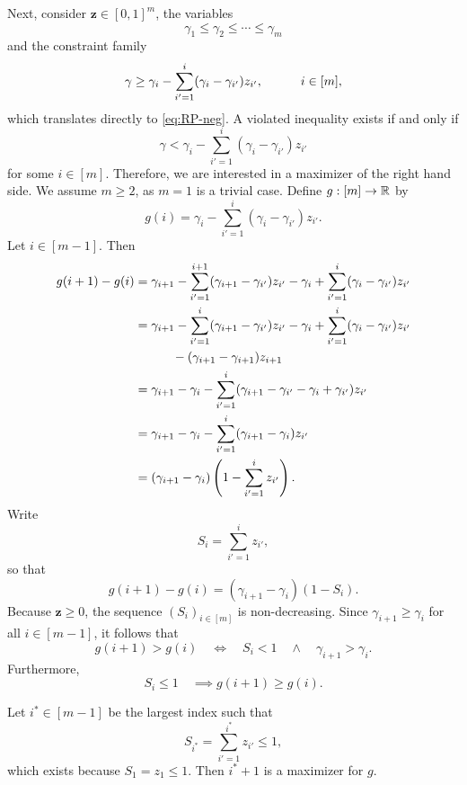 Next, consider $\bm{z} \in [0,1]^m$, the variables
\[
    \gamma_1 \leq \gamma_2 \leq \cdots \leq \gamma_m
\]
and the constraint family
\begin{equation}\label{eq:RP-neg-onedim}
    \gamma \geq \gamma_i - \sum_{i' = 1}^{i} (\gamma_i - \gamma_{i'}) z_{i'}, \quad \quad \quad i \in [m],
\end{equation}
which translates directly to \eqref{eq:RP-neg}.
A violated inequality exists if and only if
\[
    \gamma < \gamma_i -  \sum_{i' = 1}^{i} (\gamma_i - \gamma_{i'}) z_{i'}
\]
for some $i \in [m].$
Therefore, we are interested in a maximizer of the right hand side.
We assume $m \geq 2$, as $m=1$ is a trivial case.
Define $g: [m] \to \mathbb{R}$ by
\[
    g(i) = \gamma_i - \sum_{i' = 1}^{i} (\gamma_i - \gamma_{i'}) z_{i'}.
\]
Let $i \in [m-1].$ Then
\[
    \begin{split}
        g(i+1) - g(i) &= \gamma_{i+1} - \sum_{i' = 1}^{i+1} (\gamma_{i+1} - \gamma_{i'}) z_{i'} - \gamma_i + \sum_{i' = 1}^{i} (\gamma_i - \gamma_{i'}) z_{i'} \\
        &= \gamma_{i+1} - \sum_{i' = 1}^{i} (\gamma_{i+1} - \gamma_{i'}) z_{i'} - \gamma_i + \sum_{i' = 1}^{i} (\gamma_i - \gamma_{i'}) z_{i'} \\ & \quad \quad \quad -  (\gamma_{i+1} - \gamma_{i+1})z_{i+1}  \\
        &= \gamma_{i+1} - \gamma_i - \sum_{i' = 1}^{i} (\gamma_{i+1} - \gamma_{i'} - \gamma_i + \gamma_{i'}) z_{i'} \\
        &= \gamma_{i+1} - \gamma_i - \sum_{i' = 1}^{i} (\gamma_{i+1} - \gamma_i) z_{i'} \\
        &= (\gamma_{i+1} - \gamma_i) \left(1 - \sum_{i' = 1}^{i} z_{i'}\right).
    \end{split}
\]
Write
\[
    S_i = \sum_{i'=1}^{i} z_{i'},
\] so that
\[
    g(i+1) - g(i) = (\gamma_{i+1} - \gamma_i)(1 - S_i).
\]
Because $\bm{z} \geq 0$, the sequence $(S_i)_{i \in [m]}$ is non-decreasing.
Since $\gamma_{i+1} \geq \gamma_i$ for all $i \in [m-1]$, it follows that
\begin{equation}\label{eq:sep-neg-obs-1}
    g(i+1) > g(i) \quad \iff \quad  S_i < 1 \quad \wedge \quad  \gamma_{i+1} > \gamma_i.
\end{equation}
Furthermore,
\begin{equation}\label{eq:sep-neg-obs-2}
    S_i \leq 1 \quad \implies g(i+1) \geq g(i).
\end{equation}
\begin{theorem}\label{thm:sep-neg-opt}
    Let $i^* \in [m-1]$ be the largest index such that
    \[
        S_{i^*} = \sum_{i' = 1}^{i^*} z_{i'} \leq 1,
    \]
    which exists because $S_1 = z_1 \leq 1$.
    Then $i^*+1$ is a maximizer for $g$.
\end{theorem}

